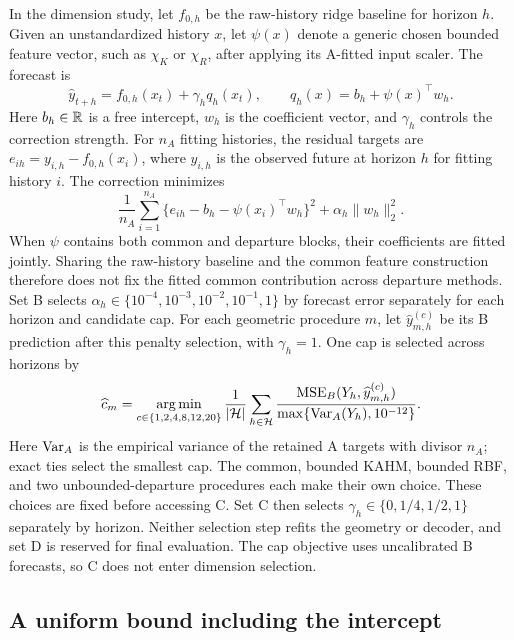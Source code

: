In the dimension study, let $f_{0,h}$ be the raw-history ridge baseline
for horizon $h$. Given
an unstandardized history $x$, let $\psi(x)$ denote a generic chosen
bounded feature vector, such as $\chi_K$ or $\chi_R$, after applying its
A-fitted input scaler. The forecast is
\begin{equation}
 \widehat y_{t+h}=f_{0,h}(x_t)+\gamma_h q_h(x_t),\qquad
 q_h(x)=b_h+\psi(x)^\top w_h.
 \label{eq:mechanism-main-forecast}
\end{equation}
Here $b_h\in\mathbb{R}$ is a free intercept, $w_h$ is the coefficient vector,
and $\gamma_h$ controls the correction strength. For $n_A$ fitting
histories, the residual targets are
$e_{ih}=y_{i,h}-f_{0,h}(x_i)$, where $y_{i,h}$ is the observed future
at horizon $h$ for fitting history $i$. The correction minimizes
\[
 \frac1{n_A}\sum_{i=1}^{n_A}
       \{e_{ih}-b_h-\psi(x_i)^\top w_h\}^2
       +\alpha_h\|w_h\|_2^2.
\]
When $\psi$ contains both common and departure blocks, their coefficients
are fitted jointly. Sharing the raw-history baseline and the common
feature construction therefore does not fix the fitted common
contribution across departure methods.
Set B selects $\alpha_h\in\{10^{-4},10^{-3},10^{-2},10^{-1},1\}$
by forecast error separately for each horizon and candidate cap.
For each geometric procedure $m$, let $\widehat y^{(c)}_{m,h}$ be its
B prediction after this penalty selection, with $\gamma_h=1$. One cap
is selected across horizons by
\begin{equation}
 \widehat c_m=\mathop{\arg\min}_{c\in\{1,2,4,8,12,20\}}
 \frac1{|\mathcal H|}\sum_{h\in\mathcal H}
 \frac{\operatorname{MSE}_B(Y_h,\widehat y^{(c)}_{m,h})}
 {\max\{\operatorname{Var}_A(Y_h),10^{-12}\}}.
 \label{eq:dimension-cap-selection}
\end{equation}
Here $\operatorname{Var}_A$ is the empirical variance of the retained A targets with
divisor $n_A$; exact ties select the smallest cap. The common, bounded
KAHM, bounded RBF, and two unbounded-departure procedures each make
their own choice. These choices are fixed before accessing C.
Set C then selects $\gamma_h\in\{0,1/4,1/2,1\}$ separately by
horizon. Neither selection step refits the geometry or decoder, and
set D is reserved for final evaluation. The cap objective uses
uncalibrated B forecasts, so C does not enter dimension selection.

\subsection{A uniform bound including the intercept}

